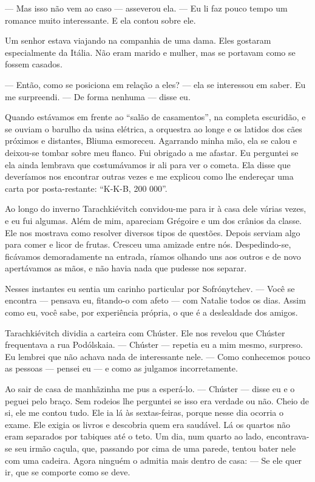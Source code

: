 --- Mas isso não vem ao caso --- asseverou ela. --- Eu li faz pouco
tempo um romance muito interessante. E ela contou sobre ele.

Um senhor estava viajando na companhia de uma dama. Eles gostaram
especialmente da Itália. Não eram marido e mulher, mas se portavam como
se fossem casados.

--- Então, como se posiciona em relação a eles? --- ela se interessou em
saber. Eu me surpreendi. --- De forma nenhuma --- disse eu.

Quando estávamos em frente ao ``salão de casamentos'', na completa
escuridão, e se ouviam o barulho da usina elétrica, a orquestra ao longe
e os latidos dos cães próximos e distantes, Bliuma esmoreceu. Agarrando
minha mão, ela se calou e deixou-se tombar sobre meu flanco. Fui
obrigado a me afastar. Eu perguntei se ela ainda lembrava que
costumávamos ir ali para ver o cometa. Ela disse que deveríamos nos
encontrar outras vezes e me explicou como lhe endereçar uma carta por
posta-restante: ``K-K-B, 200 000''.

Ao longo do inverno Tarachkiévitch convidou-me para ir à casa dele
várias vezes, e eu fui algumas. Além de mim, apareciam Grégoire e um dos
crânios da classe. Ele nos mostrava como resolver diversos tipos de
questões. Depois serviam algo para comer e licor de frutas. Cresceu uma
amizade entre nós. Despedindo-se, ficávamos demoradamente na entrada,
ríamos olhando uns aos outros e de novo apertávamos as mãos, e não havia
nada que pudesse nos separar.

Nesses instantes eu sentia um carinho particular por Sofrónytchev. ---
Você se encontra --- pensava eu, fitando-o com afeto --- com Natalie
todos os dias. Assim como eu, você sabe, por experiência própria, o que
é a deslealdade dos amigos.

Tarachkiévitch dividia a carteira com Chúster. Ele nos revelou que
Chúster frequentava a rua Podólskaia. --- Chúster --- repetia eu a mim
mesmo, surpreso. Eu lembrei que não achava nada de interessante nele.
--- Como conhecemos pouco as pessoas --- pensei eu --- e como as
julgamos incorretamente.

Ao sair de casa de manhãzinha me pus a esperá-lo. --- Chúster --- disse
eu e o peguei pelo braço. Sem rodeios lhe perguntei se isso era verdade
ou não. Cheio de si, ele me contou tudo. Ele ia lá às sextas-feiras,
porque nesse dia ocorria o exame. Ele exigia os livros e descobria quem
era saudável. Lá os quartos não eram separados por tabiques até o teto.
Um dia, num quarto ao lado, encontrava-se seu irmão caçula, que,
passando por cima de uma parede, tentou bater nele com uma cadeira.
Agora ninguém o admitia mais dentro de casa: --- Se ele quer ir, que se
comporte como se deve.

